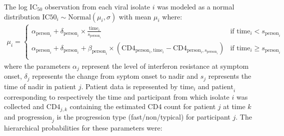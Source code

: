 \documentclass[12pt]{article}
\newcommand{\icFifty}{IC$_{50}$}
\begin{document}
 The log \icFifty{} observation from each viral isolate $i$ was modeled as a normal distribution $\text{IC50}_i\sim\text{Normal}(\mu_i,\sigma)$ with mean $\mu_i$ where:
\begin{align*}
  \mu_i=\begin{cases} 
    \alpha_{\text{person}_i}+\delta_{\text{person}_i}\times\frac{\text{time}_i}{s_{\text{person}_i}} & \text{if } \text{time}_i<s_{\text{person}_i}\\
    \alpha_{\text{person}_i}+\delta_{\text{person}_i} + \beta_{\text{person}_i}\times(\text{CD4}_{\text{person$_i$},\text{time}_i}-\text{CD4}_{\text{person$_i$},s_\text{person$_i$}}) & \text{if } \text{time}_i\ge s_{\text{person}_i}\\
  \end{cases}
\end{align*}
where the parameters $\alpha_j$ represent the level of interferon resistance at symptom onset, $\delta_j$ represents the change from syptom onset to nadir and $s_j$ represents the time of nadir in patient $j$. Patient data is represented by $\text{time}_i$ and $\text{patient}_i$ corresponding to respectively  the time and participant from which isolate $i$ was collected and $\text{CD4}_{j,k}$ containing the estimated CD4 count for patient $j$ at time $k$ and $\text{progression}_j$ is the progression type (fast/non/typical) for participant $j$. The hierarchical probabilities for these parameters were:
\end{document}

